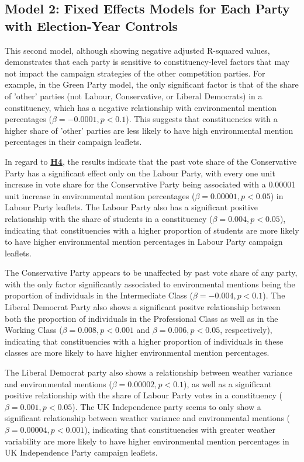 \documentclass[preprint,12pt,authoryear]{elsarticle}
\begin{document}
\subsection{Model 2: Fixed Effects Models for Each Party with Election-Year Controls}

This second model, although showing negative adjusted R-squared values, demonstrates that each party is sensitive to constituency-level factors that may not impact the campaign strategies of the other competition parties. For example, in the Green Party model, the only significant factor is that of the share of 'other' parties (not Labour, Conservative, or Liberal Democrats) in a constituency, which has a negative relationship with environmental mention percentages (\(\beta = -0.0001, p < 0.1\)). This suggests that constituencies with a higher share of 'other' parties are less likely to have high environmental mention percentages in their campaign leaflets.

In regard to \textbf{\hyperlink{H4}{H4}}, the results indicate that the past vote share of the Conservative Party has a significant effect only on the Labour Party, with every one unit increase in vote share for the Conservative Party being associated with a 0.00001 unit increase in environmental mention percentages (\(\beta = 0.00001, p < 0.05\)) in Labour Party leaflets. The Labour Party also has a significant positive relationship with the share of students in a constituency (\(\beta = 0.004, p < 0.05\)), indicating that constituencies with a higher proportion of students are more likely to have higher environmental mention percentages in Labour Party campaign leaflets.

The Conservative Party appears to be unaffected by past vote share of any party, with the only factor significantly associated to environmental mentions being the proportion of individuals in the Intermediate Class (\(\beta = -0.004, p < 0.1\)). The Liberal Democrat Party also shows a significant positve relationship between both the proportion of individuals in the Professional Class as well as in the Working Class (\(\beta = 0.008, p < 0.001\) and \(\beta = 0.006, p < 0.05\), respectively), indicating that constituencies with a higher proportion of individuals in these classes are more likely to have higher environmental mention percentages. 

The Liberal Democrat party also shows a relationship between weather variance and environmental mentions (\(\beta = 0.00002, p < 0.1\)), as well as a significant positive relationship with the share of Labour Party votes in a constituency (\(\beta = 0.001, p < 0.05\)). The UK Independence party seems to only show a significant relationship between weather variance and environmental mentions (\(\beta = 0.00004, p < 0.001\)), indicating that constituencies with greater weather variability are more likely to have higher environmental mention percentages in UK Independence Party campaign leaflets.
\end{document}
